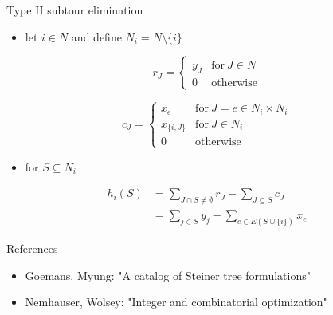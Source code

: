 \documentclass[usenames,dvipsnames]{beamer}
\begin{document}
\begin{frame}{Type II subtour elimination}
  \begin{itemize}
  \item let $i \in N$ and define $N_i = N \setminus \{i\}$
  \end{itemize}
  \begin{minipage}{0.49\textwidth}
    \[r_J = \begin{cases} y_J & \text{for}~J \in N\\
      0 & \text{otherwise}\end{cases}\]
  \end{minipage}
  \begin{minipage}{0.49\textwidth}
    \[c_J = \begin{cases} x_{e} & \text{for}~J=e \in N_i \times N_i\\
      x_{\{i,J\}} & \text{for}~J \in N_i \\ 0 &
      \text{otherwise}\end{cases}\]
  \end{minipage}
  \begin{itemize}
  \item for $S \subseteq N_i$
  \end{itemize}
  \begin{align*}
    h_i(S) &= \sum\limits_{J \cap S \neq \emptyset} r_J - \sum\limits_{J \subseteq S} c_J \\
    &= \sum\limits_{j \in S} y_j - \sum\limits_{e \in E(S \cup \{i\})} x_e
  \end{align*}
\end{frame}

\begin{frame}{References}
  \begin{itemize}
  \item Goemans, Myung: "A catalog of Steiner tree formulations"
  \item Nemhauser, Wolsey: "Integer and combinatorial optimization"
  \end{itemize}
\end{frame}
\end{document}
